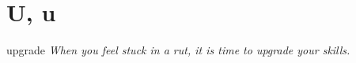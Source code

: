 \section{U, u}

\begin{DefWord}{upgrade}
    \textit{When you feel stuck in a rut, it is time to upgrade your skills.}
\end{DefWord}